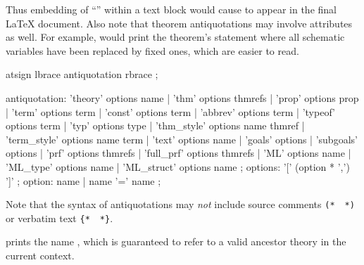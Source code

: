 \begin{isabellebody}
\begin{isamarkuptext}
  Thus embedding of ``''
  within a text block would cause
   to appear in the final {\LaTeX} document.  Also note that theorem
  antiquotations may involve attributes as well.  For example,
   would print the theorem's
  statement where all schematic variables have been replaced by fixed
  ones, which are easier to read.

  \begin{rail}
    atsign lbrace antiquotation rbrace
    ;

    antiquotation:
      'theory' options name |
      'thm' options thmrefs |
      'prop' options prop |
      'term' options term |
      'const' options term |
      'abbrev' options term |
      'typeof' options term |
      'typ' options type |
      'thm\_style' options name thmref |
      'term\_style' options name term |
      'text' options name |
      'goals' options |
      'subgoals' options |
      'prf' options thmrefs |
      'full\_prf' options thmrefs |
      'ML' options name |
      'ML\_type' options name |
      'ML\_struct' options name
    ;
    options: '[' (option * ',') ']'
    ;
    option: name | name '=' name
    ;
  \end{rail}

  Note that the syntax of antiquotations may \emph{not} include source
  comments \verb|(*|~\isa{{\isachardoublequote}{\isasymdots}{\isachardoublequote}}~\verb|*)| or verbatim
  text \verb|{|\verb|*|~\isa{{\isachardoublequote}{\isasymdots}{\isachardoublequote}}~\verb|*|\verb|}|.

  \begin{descr}
  
  \item [\isa{{\isachardoublequote}{\isacharat}{\isacharbraceleft}theory\ A{\isacharbraceright}{\isachardoublequote}}] prints the name , which is
  guaranteed to refer to a valid ancestor theory in the current
  context.


\end{descr}
\end{isamarkuptext}
\end{isabellebody}
